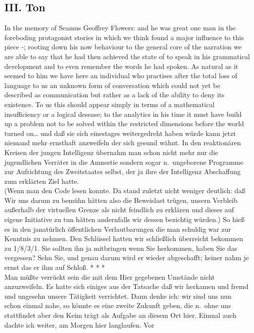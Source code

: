 \documentclass[
]{article}
\author{}
\date{\vspace{-2.5em}}
\begin{document}
\subsection{III. Ton}\label{iii.-ton}

In the memory of Seamus Geoffrey Flowers: and he was great one man in
the foreboding protagonist stories in which we think found a major
influence to this piece -; rooting down his now behaviour to the general
core of the narration we are able to say that he had then achieved the
state of to speak in his grammatical development and to even remember
the words he had spoken. As natural as it seemed to him we have here an
individual who practises after the total loss of language to us an
unknown form of conversation which could not yet be described as
communication but rather as a lack of the ability to deny its existence.
To us this should appear simply in terms of a mathematical insufficiency
or a logical desease; to the analytics in his time it must have build up
a problem not to be solved within the restricted dimensions before the
world turned on\ldots{} und daß sie sich einestages weitergedreht haben
würde kann jetzt niemand mehr ernsthaft anzweifeln der sich gesund
wähnt. In den reaktionären Kreisen der jungen Intelligenz übernahm man
schon nicht mehr nur die jugendlichen Verräter in die Amnestie sondern
sogar n.~ungeborene Programme zur Aufrichtung des Zweitstaates selbst,
der ja ihre der Intelligenz Abschaffung zum erklärten Ziel hatte.\\
(Wenn man den Code lesen konnte. Da stand zuletzt nicht weniger
deutlich: daß Wir uns darum zu bemühn hätten also die Beweislast trügen,
unsern Verbleib außerhalb der virtuellen Grenze als nicht feindlich zu
erklären und dieses auf eigene Initiative zu tun hätten andernfalls wir
dessen bezichtig würden.) So hieß es in den janatürlich öffentlichen
Verlautbarungen die man schuldig war zur Kenntnis zu nehmen. Den
Schlüssel hatten wir schließlich überreicht bekommen zu 1/8/3/1. Sie
sollten ihn ja mitbringen wenn Sie herkommen, haben Sie das vergessen?
Sehn Sie, und genau darum wird er wieder abgeschafft; keiner nahm je
ernst das er ihm auf Schloß. * * *\\
Man müßte verrückt sein die mit dem Hier gegebenen Umstände nicht
anzuzweifeln. Es hatte sich einiges aus der Tatsache daß wir herkamen
und fremd und ungesehn unsere Tätigkeit verrichtet. Dann denke ich: wir
sind uns nun schon einmal nahe, so könnte es eine zweite Zukunft geben,
die n.~ohne uns stattfindet aber den Keim trägt als Aufgabe an diesem
Ort hier. Einmal auch dachte ich weiter, am Morgen hier langlaufen. Vor
\end{document}
